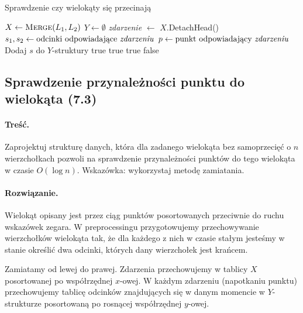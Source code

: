 \begin{algorithm}[H]
	\caption{Sprawdzenie czy wielokąty się przecinają}
	\begin{algorithmic}[1]
		\State $X \gets \textsc{Merge}(L_1, L_2)$ 
		\State $Y \gets \emptyset$
		\State \textit{zdarzenie} $\gets$ $X.$DetachHead()
		\State $s_1, s_2 \gets \text{odcinki odpowiadające \textit{zdarzeniu}}$
		\State $p \gets \text{punkt odpowiadający \textit{zdarzeniu}}$
		\State Dodaj $s$ do $Y$-struktury
		\State \Return true
		\EndIf
		\State \Return true
		\EndIf
		\Else
		\State \Return true
		\EndIf
		\EndIf
		\EndWhile
		\State \Return false
		\EndProcedure
	\end{algorithmic}
	\label{algZadanie7_1}
\end{algorithm}

\subsection{Sprawdzenie przynależności punktu do wielokąta (7.3)}
\paragraph{Treść.} Zaprojektuj strukturę danych, która dla zadanego wielokąta bez samoprzecięć o 
$n$ wierzchołkach pozwoli
na sprawdzenie przynależności punktów do tego wielokąta w czasie $O(\log n)$.
Wskazówka: wykorzystaj metodę zamiatania.
\paragraph{Rozwiązanie.} 
Wielokąt opisany jest przez ciąg punktów posortowanych przeciwnie do ruchu wskazówek zegara. W preprocessingu przygotowujemy przechowywanie wierzchołków wielokąta tak, że dla każdego z nich w czasie stałym jesteśmy w stanie określić dwa odcinki, których dany wierzchołek jest krańcem.

Zamiatamy od lewej do prawej. Zdarzenia przechowujemy w tablicy $X$ posortowanej po współrzędnej $x$-owej. W każdym zdarzeniu (napotkaniu punktu) przechowujemy tablicę odcinków znajdujących się w danym momencie w $Y$-strukturze posortowaną po rosnącej współrzędnej $y$-owej. 

